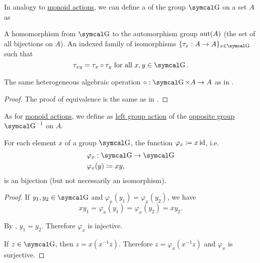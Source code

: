 \begin{definition}\label{def:left_group_action}
  In analogy to \hyperref[def:left_monoid_action]{monoid actions}, we can define a  of the group \( \CG \) on a set \( A \) as
  \begin{DefEnum}
     A homomorphism from \( \CG \) to the automorphism group \( \operatorname{aut}(A) \) (the set of all bijections on \( A \)).
     An indexed family of isomorphisms \( \{ \tau_x: A \to A \}_{x \in \CG} \) such that
    \begin{equation}\label{eq:def:left_group_action/indirect_homomorphism}
      \tau_{xy} = \tau_x \circ \tau_y \Tforall x, y \in \CG.
    \end{equation}

     The same heterogeneous algebraic operation \( \circ: \CG \times A \to A \) as in .
  \end{DefEnum}
\end{definition}
\begin{proof}
  The proof of equivalence is the same as in .
\end{proof}

\begin{definition}\label{def:right_group_action}
  As for \hyperref[def:right_monoid_action]{monoid actions}, we define  as \hyperref[def:left_group_action]{left group action} of the \hyperref[def:magma/opposite]{opposite group} \( \CG^{-1} \) on \( A \).
\end{definition}

\begin{lemma}\label{thm:group_multiplication_is_bijection}
  For each element \( x \) of a group \( \CG \), the function \( \varphi_x \coloneqq x\operatorname{id} \), i.e.
  \begin{align*}
    &\varphi_x: \CG \to \CG \\
    &\varphi_x(y) \coloneqq xy,
  \end{align*}
  is an bijection (but not necessarily an isomorphism).
\end{lemma}
\begin{proof}
   If \( y_1, y_2 \in \CG \) and \( \varphi_x(y_1) = \varphi_x(y_2) \), we have
  \begin{equation*}
    xy_1 = \varphi_x(y_1) = \varphi_x(y_2) = xy_2.
  \end{equation*}

  By , \( y_1 = y_2 \). Therefore \( \varphi_x \) is injective.

   If \( z \in \CG \), then \( z = x(x^{-1} z) \). Therefore \( z = \varphi_x(x^{-1} z) \) and \( \varphi_x \) is surjective.
\end{proof}

